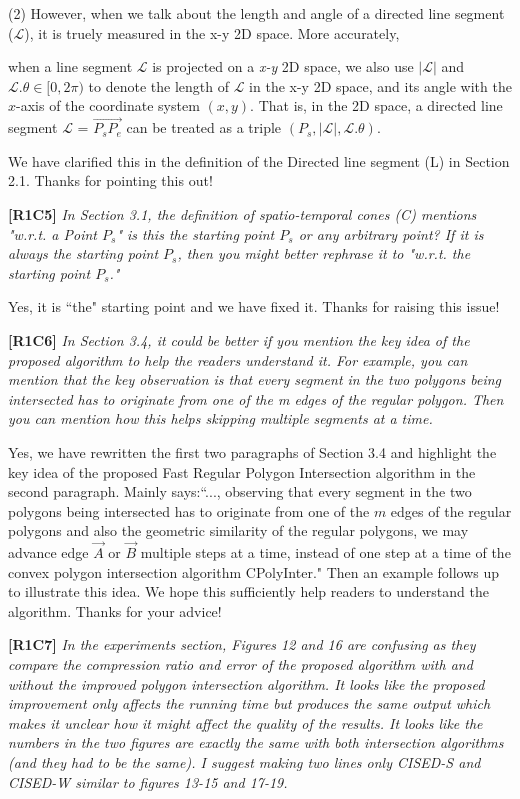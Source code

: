 \documentclass{letter}
\newcommand{\vv}{\overrightarrow}
\begin{document}
(2) However, when we talk about the length and angle of a directed line segment ($\mathcal{L}$), it is truely measured in the x-y 2D space. More accurately, {when a line segment $\mathcal{L}$ is projected on a \emph{x-y} 2D space, we also use $|\mathcal{L}|$ and $\mathcal{L}.\theta\in [0, 2\pi)$ to denote the length of $\mathcal{L}$ in the x-y 2D space, and its angle with the $x$-axis of the coordinate system $(x, y)$.  That is, in the 2D space, a directed line segment $\mathcal{L}$ = $\vv{P_{s}P_{e}}$ can be treated as a triple $(P_s, |\mathcal{L}|, \mathcal{L}.\theta)$.

We have clarified this in the definition of the Directed line segment (L) in Section 2.1. Thanks for pointing this out!


\textbf{[R1C5]} \emph{In Section 3.1, the definition of spatio-temporal cones (C) mentions "w.r.t. a Point $P_s$" is this the starting point $P_s$ or any arbitrary point? If it is always the starting point $P_s$, then you might better rephrase it to "w.r.t. the starting point $P_s$."}

Yes, it is ``the" starting point and we have fixed it. Thanks for raising this issue!

\textbf{[R1C6]} \emph{In Section 3.4, it could be better if you mention the key idea of the proposed algorithm to help the readers understand it. For example, you can mention that the key observation is that every segment in the two polygons being intersected has to originate from one of the m edges of the regular polygon. Then you can mention how this helps skipping multiple segments at a time.}

Yes, we have rewritten the first two paragraphs of Section 3.4 and highlight the key idea of the proposed Fast Regular Polygon Intersection algorithm in the second paragraph.
{Mainly says:``..., observing that every segment in the two polygons being intersected has to originate from one of the $m$ edges of the regular polygons and also the geometric similarity of the regular polygons,
we may advance edge $\vv{A}$ or $\vv{B}$ multiple steps at a time, instead of one step at a time of the convex polygon intersection algorithm CPolyInter."} Then an example follows up to illustrate this idea.
We hope this sufficiently help readers to understand the algorithm. Thanks for your advice!



\textbf{[R1C7]} \emph{In the experiments section, Figures 12 and 16 are confusing as they compare the compression ratio and error of the proposed algorithm with and without the improved polygon intersection algorithm. It looks like the proposed improvement only affects the running time but produces the same output which makes it unclear how it might affect the quality of the results. It looks like the numbers in the two figures are exactly the same with both intersection algorithms (and they had to be the same). I suggest making two lines only CISED-S and CISED-W similar to figures 13-15 and 17-19.}

}
\end{document}
